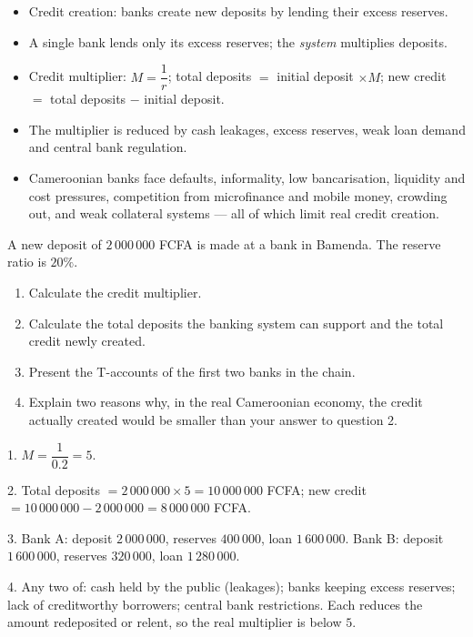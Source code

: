 \documentclass[11pt]{article}
\begin{document}
\begin{aretenir}
\begin{itemize}
\item Credit creation: banks create new deposits by lending their excess reserves.
\item A single bank lends only its excess reserves; the \emph{system} multiplies deposits.
\item Credit multiplier: $M = \dfrac{1}{r}$; total deposits $=$ initial deposit $\times M$; new credit $=$ total deposits $-$ initial deposit.
\item The multiplier is reduced by cash leakages, excess reserves, weak loan demand and central bank regulation.
\item Cameroonian banks face defaults, informality, low bancarisation, liquidity and cost pressures, competition from microfinance and mobile money, crowding out, and weak collateral systems — all of which limit real credit creation.
\end{itemize}
\end{aretenir}

\begin{exercice}
A new deposit of $2\,000\,000$ FCFA is made at a bank in Bamenda. The reserve ratio is $20\%$.
\begin{enumerate}
\item Calculate the credit multiplier.
\item Calculate the total deposits the banking system can support and the total credit newly created.
\item Present the T-accounts of the first two banks in the chain.
\item Explain two reasons why, in the real Cameroonian economy, the credit actually created would be smaller than your answer to question 2.
\end{enumerate}
\end{exercice}

\begin{corrige}[Exercise 1]
1. $M = \dfrac{1}{0.2} = 5$.

2. Total deposits $= 2\,000\,000 \times 5 = 10\,000\,000$ FCFA; new credit $= 10\,000\,000 - 2\,000\,000 = 8\,000\,000$ FCFA.

3. Bank A: deposit $2\,000\,000$, reserves $400\,000$, loan $1\,600\,000$. Bank B: deposit $1\,600\,000$, reserves $320\,000$, loan $1\,280\,000$.

4. Any two of: cash held by the public (leakages); banks keeping excess reserves; lack of creditworthy borrowers; central bank restrictions. Each reduces the amount redeposited or relent, so the real multiplier is below $5$.
\end{corrige}
\end{document}
